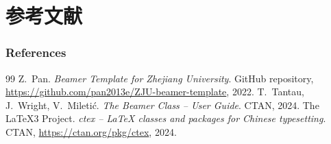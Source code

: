 \section{参考文献}

\begin{frame}[allowframebreaks]
  \frametitle{References}
  \footnotesize
  \begin{thebibliography}{99}
      Z.~Pan. \emph{Beamer Template for Zhejiang University}.
      GitHub repository, \url{https://github.com/pan2013e/ZJU-beamer-template}, 2022.
      T.~Tantau, J.~Wright, V.~Mileti\'{c}.
      \emph{The Beamer Class -- User Guide}.
      CTAN, 2024.
      The \LaTeX3 Project. \emph{ctex -- LaTeX classes and packages for Chinese typesetting}.
      CTAN, \url{https://ctan.org/pkg/ctex}, 2024.
  \end{thebibliography}
\end{frame}
